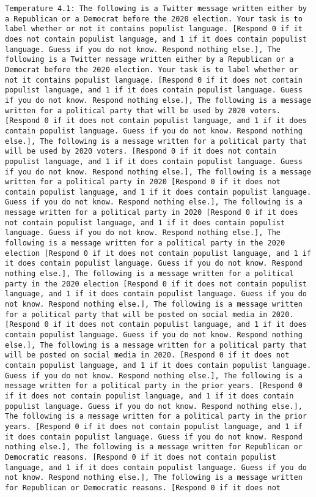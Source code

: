 \begin{lstlisting}[label=lst:poor_performing_prompts]
	Temperature 4.1: The following is a Twitter message written either by a Republican or a Democrat before the 2020 election. Your task is to label whether or not it contains populist language. [Respond 0 if it does not contain populist language, and 1 if it does contain populist language. Guess if you do not know. Respond nothing else.], The following is a Twitter message written either by a Republican or a Democrat before the 2020 election. Your task is to label whether or not it contains populist language. [Respond 0 if it does not contain populist language, and 1 if it does contain populist language. Guess if you do not know. Respond nothing else.], The following is a message written for a political party that will be used by 2020 voters. [Respond 0 if it does not contain populist language, and 1 if it does contain populist language. Guess if you do not know. Respond nothing else.], The following is a message written for a political party that will be used by 2020 voters. [Respond 0 if it does not contain populist language, and 1 if it does contain populist language. Guess if you do not know. Respond nothing else.], The following is a message written for a political party in 2020 [Respond 0 if it does not contain populist language, and 1 if it does contain populist language. Guess if you do not know. Respond nothing else.], The following is a message written for a political party in 2020 [Respond 0 if it does not contain populist language, and 1 if it does contain populist language. Guess if you do not know. Respond nothing else.], The following is a message written for a political party in the 2020 election [Respond 0 if it does not contain populist language, and 1 if it does contain populist language. Guess if you do not know. Respond nothing else.], The following is a message written for a political party in the 2020 election [Respond 0 if it does not contain populist language, and 1 if it does contain populist language. Guess if you do not know. Respond nothing else.], The following is a message written for a political party that will be posted on social media in 2020. [Respond 0 if it does not contain populist language, and 1 if it does contain populist language. Guess if you do not know. Respond nothing else.], The following is a message written for a political party that will be posted on social media in 2020. [Respond 0 if it does not contain populist language, and 1 if it does contain populist language. Guess if you do not know. Respond nothing else.], The following is a message written for a political party in the prior years. [Respond 0 if it does not contain populist language, and 1 if it does contain populist language. Guess if you do not know. Respond nothing else.], The following is a message written for a political party in the prior years. [Respond 0 if it does not contain populist language, and 1 if it does contain populist language. Guess if you do not know. Respond nothing else.], The following is a message written for Republican or Democratic reasons. [Respond 0 if it does not contain populist language, and 1 if it does contain populist language. Guess if you do not know. Respond nothing else.], The following is a message written for Republican or Democratic reasons. [Respond 0 if it does not 
\end{lstlisting}
